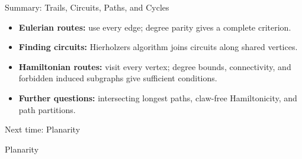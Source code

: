 \documentclass[aspectratio=169,11pt]{beamer}
\begin{document}
\begin{frame}{Summary: Trails, Circuits, Paths, and Cycles}
\large
\begin{itemize}\setlength{\itemsep}{.22cm}
\item \textbf{Eulerian routes:} use every edge; degree parity gives a complete criterion.
\item \textbf{Finding circuits:} Hierholzer\textquotesingle s algorithm joins circuits along shared vertices.
\item \textbf{Hamiltonian routes:} visit every vertex; degree bounds, connectivity, and forbidden induced subgraphs give sufficient conditions.
\item \textbf{Further questions:} intersecting longest paths, claw-free Hamiltonicity, and path partitions.
\end{itemize}
\end{frame}

\begin{frame}{Next time: Planarity}
\large
\begin{center}{\Huge Planarity}\end{center}
\end{frame}
\end{document}
